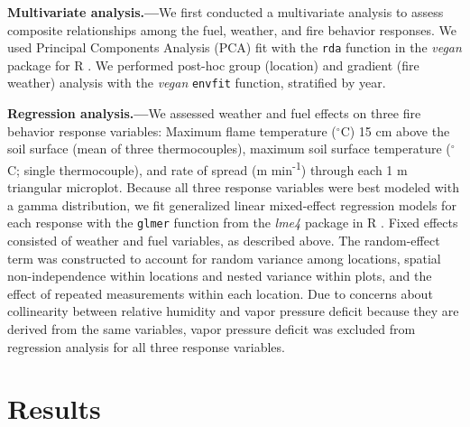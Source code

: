 \documentclass[referee, 
		     sn-basic]{sn-jnl}
\newcommand{\degC}{$^\circ$C}
\begin{document}
\begin{linenumbers}
\textbf{Multivariate analysis.---}We first conducted a multivariate analysis to assess composite relationships among the fuel, weather, and fire behavior responses. 
We used Principal Components Analysis (PCA) fit with the \texttt{rda} function in the \emph{vegan} package for \textsf{R} \citep{oksanen2017}. 
We performed post-hoc group (location) and gradient (fire weather) analysis with the \emph{vegan} \texttt{envfit} function, stratified by year.

\textbf{Regression analysis.---}We assessed weather and fuel effects on three fire behavior response variables: Maximum flame temperature (\degC) 15 cm above the soil surface (mean of three thermocouples), maximum soil surface temperature (\degC; single thermocouple), and rate of spread (m min\textsuperscript{-1}) through each 1 m triangular microplot. 
Because all three response variables were best modeled with a gamma distribution, we fit generalized linear mixed-effect regression models for each response with the \texttt{glmer} function from the \emph{lme4} package in \textsf{R} \citep{bates2015}. 
Fixed effects consisted of weather and fuel variables, as described above. 
The random-effect term was constructed to account for random variance among
locations, spatial non-independence within locations and nested variance
within plots, and the effect of repeated measurements within each
location. 
Due to concerns about collinearity between relative humidity
and vapor pressure deficit because they are derived from the same
variables, vapor pressure deficit was excluded from regression analysis
for all three response variables.

\section{Results}


\end{linenumbers}
\end{document}
